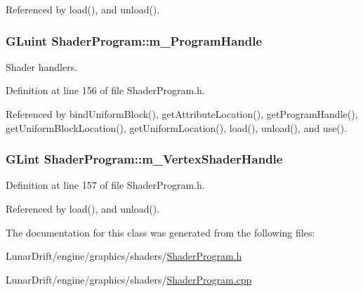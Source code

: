 Referenced by load(), and unload().

\subsubsection[{\texorpdfstring{m\+\_\+\+Program\+Handle}{m_ProgramHandle}}]{\setlength{\rightskip}{0pt plus 5cm}G\+Luint Shader\+Program\+::m\+\_\+\+Program\+Handle\hspace{0.3cm}{\ttfamily [private]}}\hypertarget{class_shader_program_aeeb7c9dabeaae9aba49858cf3221d887}{}\label{class_shader_program_aeeb7c9dabeaae9aba49858cf3221d887}


Shader handlers. 



Definition at line 156 of file Shader\+Program.\+h.



Referenced by bind\+Uniform\+Block(), get\+Attribute\+Location(), get\+Program\+Handle(), get\+Uniform\+Block\+Location(), get\+Uniform\+Location(), load(), unload(), and use().

\subsubsection[{\texorpdfstring{m\+\_\+\+Vertex\+Shader\+Handle}{m_VertexShaderHandle}}]{\setlength{\rightskip}{0pt plus 5cm}G\+Lint Shader\+Program\+::m\+\_\+\+Vertex\+Shader\+Handle\hspace{0.3cm}{\ttfamily [private]}}\hypertarget{class_shader_program_a2056277d1b0c3a71a7b783e17e3733a1}{}\label{class_shader_program_a2056277d1b0c3a71a7b783e17e3733a1}


Definition at line 157 of file Shader\+Program.\+h.



Referenced by load(), and unload().



The documentation for this class was generated from the following files\+:\begin{DoxyCompactItemize}
\item 
Lunar\+Drift/engine/graphics/shaders/\hyperlink{_shader_program_8h}{Shader\+Program.\+h}\item 
Lunar\+Drift/engine/graphics/shaders/\hyperlink{_shader_program_8cpp}{Shader\+Program.\+cpp}\end{DoxyCompactItemize}
